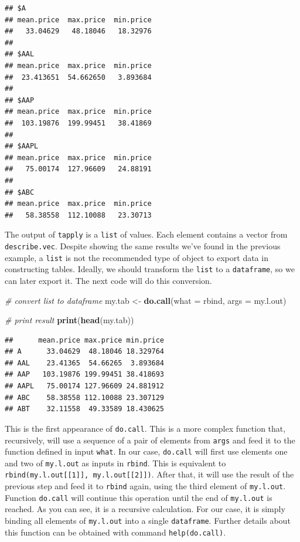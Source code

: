 \documentclass[11pt,]{book}
\newenvironment{Shaded}{\begin{snugshade}}{\end{snugshade}}
\newcommand{\KeywordTok}[1]{\textcolor[rgb]{0.27,0.27,0.27}{\textbf{#1}}}
\newcommand{\DataTypeTok}[1]{\textcolor[rgb]{0.27,0.27,0.27}{#1}}
\newcommand{\StringTok}[1]{\textcolor[rgb]{0.5,0.5,0.5}{#1}}
\newcommand{\CommentTok}[1]{\textcolor[rgb]{0.56,0.35,0.01}{\textit{#1}}}
\newcommand{\NormalTok}[1]{#1}
\begin{document}
\begin{verbatim}
## $A
## mean.price  max.price  min.price 
##   33.04629   48.18046   18.32976 
## 
## $AAL
## mean.price  max.price  min.price 
##  23.413651  54.662650   3.893684 
## 
## $AAP
## mean.price  max.price  min.price 
##  103.19876  199.99451   38.41869 
## 
## $AAPL
## mean.price  max.price  min.price 
##   75.00174  127.96609   24.88191 
## 
## $ABC
## mean.price  max.price  min.price 
##   58.38558  112.10088   23.30713
\end{verbatim}

The output of \texttt{tapply} is a \texttt{list} of values. Each element
contains a vector from \texttt{describe.vec}. Despite showing the same
results we've found in the previous example, a \texttt{list} is not the
recommended type of object to export data in constructing tables.
Ideally, we should transform the \texttt{list} to a \texttt{dataframe},
so we can later export it. The next code will do this conversion.

\begin{Shaded}
\begin{Highlighting}[]
\CommentTok{# convert list to dataframe}
\NormalTok{my.tab <-}\StringTok{ }\KeywordTok{do.call}\NormalTok{(}\DataTypeTok{what =}\NormalTok{ rbind, }\DataTypeTok{args =}\NormalTok{ my.l.out)}

\CommentTok{# print result}
\KeywordTok{print}\NormalTok{(}\KeywordTok{head}\NormalTok{(my.tab))}
\end{Highlighting}
\end{Shaded}

\begin{verbatim}
##      mean.price max.price min.price
## A      33.04629  48.18046 18.329764
## AAL    23.41365  54.66265  3.893684
## AAP   103.19876 199.99451 38.418693
## AAPL   75.00174 127.96609 24.881912
## ABC    58.38558 112.10088 23.307129
## ABT    32.11558  49.33589 18.430625
\end{verbatim}

This is the first appearance of \texttt{do.call}. This is a more complex
function that, recursively, will use a sequence of a pair of elements
from \texttt{args} and feed it to the function defined in input
\texttt{what}. In our case, \texttt{do.call} will first use elements one
and two of \texttt{my.l.out} as inputs in \texttt{rbind}. This is
equivalent to
\texttt{rbind(my.l.out{[}{[}1{]}{]},\ my.l.out{[}{[}2{]}{]})}. After
that, it will use the result of the previous step and feed it to
\texttt{rbind} again, using the third element of \texttt{my.l.out}.
Function \texttt{do.call} will continue this operation until the end of
\texttt{my.l.out} is reached. As you can see, it is a recursive
calculation. For our case, it is simply binding all elements of
\texttt{my.l.out} into a single \texttt{dataframe}. Further details
about this function can be obtained with command \texttt{help(do.call)}.
\end{document}
